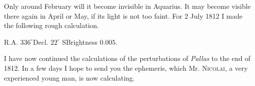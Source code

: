 \noindent Only around February will it become invisible in Aquarius. It may become visible there again in April or May, if its light is not too faint. For 2 July 1812 I made the following rough calculation.
\begin{center}R.A. $336^\circ$\quad Decl. $22^\circ$ S\quad Brightness $0.005$.\end{center}
\par{}

\par\indent I have now continued the calculations of the perturbations of \emph{Pallas} to the end of 1812. In a few days I hope to send you the ephemeris, which Mr. \textsc{Nicolai}, a very experienced young man, is now calculating.
